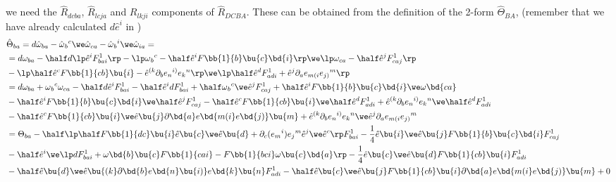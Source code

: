 we need the $\hat R_{dcba}$, $\hat R_{lcja}$ and $R_{lkji}$ components of $\hat R_{DCBA}$.
These can be obtained from the definition of the 2-form $\hat\Theta_{BA}$,  (remember that we have already calculated $d\hat e^i$ in ) 
\begin{align}
&\hat\Theta_{ba} = d\hat\omega_{ba} - \hat\omega{_b}^c\we\hat\omega_{ca} - \hat\omega{_b}^i\we\hat\omega_{ia}=\nonumber\\
&= d\omega_{ba} - \half d\lp\hat e^i F^1_{bai}\rp - \lp\omega{_b}^c - \half\hat e^i F\bb{1}{b}\bu{c}\bd{i}\rp\we\lp\omega_{ca} - \half\hat e^j F^1_{caj}\rp\nonumber\\
&- \lp\half \hat e^c F\bb{1}{cb}\bu{i} - \hat e^{(k}\partial_b e{_n}^{i)}e{_{k}}^n\rp\we\lp\half \hat e^d F^1_{adi} + \hat e^j\partial_a e_{m(i}e{_{j)}}^m\rp\nonumber\\
&= d\omega_{ba} + \omega{_b}^c\omega_{ca} - \half d\hat e^i F^1_{bai} - \half \hat e^i d F^1_{bai} + \half\omega{_b}^c\we\hat e^j F^1_{caj} + \half\hat e^i F\bb{1}{b}\bu{c}\bd{i}\we\omega\bd{ca}\nonumber\\
&- \half\hat e^i F\bb{1}{b}\bu{c}\bd{i}\we\half\hat e^j F^1_{caj} - \half \hat e^c F\bb{1}{cb}\bu{i}\we\half \hat e^d F^1_{adi} + \hat e^{(k}\partial_b e{_n}^{i)}e{_{k}}^n\we\half \hat e^d F^1_{adi}\nonumber\\
&- \half \hat e^c F\bb{1}{cb}\bu{i}\we\hat e\bu{j}\partial\bd{a} e\bd{m(i}e\bd{j)}\bu{m} + \hat e^{(k}\partial_b e{_n}^{i)}e{_{k}}^n\we\hat e^j\partial_a e_{m(i}e{_{j)}}^m\nonumber\\
&=\Theta_{ba} - \half\lp \half F\bb{1}{dc}\bu{i}\hat e\bu{c}\we\hat e\bu{d} + \partial_c(e{_m}^i) e{_j}^m\hat e^j\we\hat e^c\rp F^1_{bai} - \frac{1}{4}\hat e\bu{i}\we\hat e\bu{j} F\bb{1}{b}\bu{c}\bd{i} F^1_{caj}\nonumber\\
&- \half \hat e^i \we \lp dF^1_{bai} + \omega\bd{b}\bu{c}F\bb{1}{cai} - F\bb{1}{bci}\omega\bu{c}\bd{a}\rp - \frac{1}{4} \hat e\bu{c}\we \hat e\bu{d} F\bb{1}{cb}\bu{i}F^1_{adi}\nonumber\\
&- \half \hat e\bu{d}\we\hat e\bu{(k}\partial\bd{b} e\bd{n}\bu{i)}e\bd{k}\bu{n} F^1_{adi} - \half \hat e\bu{c}\we\hat e\bu{j} F\bb{1}{cb}\bu{i}\partial\bd{a} e\bd{m(i}e\bd{j)}\bu{m} + 0\nonumber\\
\end{align}
